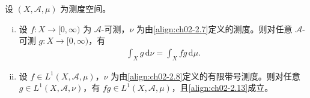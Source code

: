 \documentclass[../../main.tex]{subfiles}%
\begin{document}
\begin{proposition}\label{proposition:ch02-变量替换积分}
设 $(X,\mathscr A,\mu)$ 为测度空间。
\begin{enumerate}[(i)]
\item 设 $f:X\to[0,\infty)$ 为 $\mathscr A$-可测，$\nu$ 为由\eqref{align:ch02-2.7}定义的测度。则对任意 $\mathscr A$-可测 $g:X\to[0,\infty)$，有
\begin{align}
\int_Xg\,\mathrm{d}\nu=\int_Xfg\,\mathrm{d}\mu. \label{align:ch02-2.13}
\end{align}
\item 设 $f\in L^1(X,\mathscr A,\mu)$，$\nu$ 为由\eqref{align:ch02-2.8}定义的有限带号测度。则对任意 $g\in L^1(X,\mathscr A,\nu)$，有 $fg\in L^1(X,\mathscr A,\mu)$，且\eqref{align:ch02-2.13}成立。
\end{enumerate}
\end{proposition}
\end{document}
